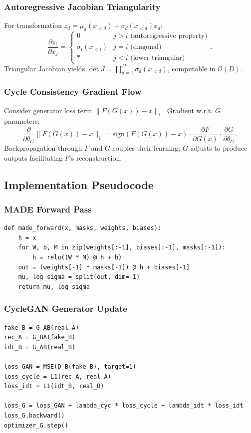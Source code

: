 \documentclass[11pt]{article}
\begin{document}
\subsubsection{Autoregressive Jacobian Triangularity}
For transformation $z_d = \mu_d(x_{<d}) + \sigma_d(x_{<d}) x_d$:
\begin{equation}
\frac{\partial z_i}{\partial x_j} = \begin{cases}
0 & j > i \text{ (autoregressive property)} \\
\sigma_i(x_{<i}) & j = i \text{ (diagonal)} \\
* & j < i \text{ (lower triangular)}
\end{cases}.
\end{equation}
Triangular Jacobian yields $\det J = \prod_{d=1}^{D} \sigma_d(x_{<d})$, computable in $\mathcal{O}(D)$.

\subsubsection{Cycle Consistency Gradient Flow}
Consider generator loss term $\|F(G(x)) - x\|_1$. Gradient w.r.t. $G$ parameters:
\begin{equation}
\frac{\partial}{\partial \theta_G} \|F(G(x)) - x\|_1 = \text{sign}(F(G(x)) - x) \cdot \frac{\partial F}{\partial G(x)} \cdot \frac{\partial G}{\partial \theta_G}.
\end{equation}
Backpropagation through $F$ and $G$ couples their learning; $G$ adjusts to produce outputs facilitating $F$'s reconstruction.

\subsection{Implementation Pseudocode}
\subsubsection{MADE Forward Pass}
\begin{verbatim}
def made_forward(x, masks, weights, biases):
    h = x
    for W, b, M in zip(weights[:-1], biases[:-1], masks[:-1]):
        h = relu((W * M) @ h + b)
    out = (weights[-1] * masks[-1]) @ h + biases[-1]
    mu, log_sigma = split(out, dim=-1)
    return mu, log_sigma
\end{verbatim}

\subsubsection{CycleGAN Generator Update}
\begin{verbatim}
fake_B = G_AB(real_A)
rec_A = G_BA(fake_B)
idt_B = G_AB(real_B)

loss_GAN = MSE(D_B(fake_B), target=1)
loss_cycle = L1(rec_A, real_A)
loss_idt = L1(idt_B, real_B)

loss_G = loss_GAN + lambda_cyc * loss_cycle + lambda_idt * loss_idt
loss_G.backward()
optimizer_G.step()
\end{verbatim}
\end{document}
